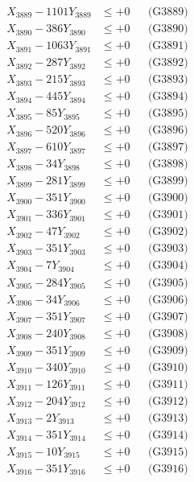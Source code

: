 \documentclass[a4paper,10pt]{article}
\begin{document}
{\begin{align}
X_{3889} - 1101Y_{3889} &\leq +0 && \text{(G3889)} \\
X_{3890} - 386Y_{3890} &\leq +0 && \text{(G3890)} \\
\allowbreak
X_{3891} - 1063Y_{3891} &\leq +0 && \text{(G3891)} \\
X_{3892} - 287Y_{3892} &\leq +0 && \text{(G3892)} \\
X_{3893} - 215Y_{3893} &\leq +0 && \text{(G3893)} \\
X_{3894} - 445Y_{3894} &\leq +0 && \text{(G3894)} \\
X_{3895} - 85Y_{3895} &\leq +0 && \text{(G3895)} \\
X_{3896} - 520Y_{3896} &\leq +0 && \text{(G3896)} \\
X_{3897} - 610Y_{3897} &\leq +0 && \text{(G3897)} \\
X_{3898} - 34Y_{3898} &\leq +0 && \text{(G3898)} \\
X_{3899} - 281Y_{3899} &\leq +0 && \text{(G3899)} \\
X_{3900} - 351Y_{3900} &\leq +0 && \text{(G3900)} \\
\allowbreak
X_{3901} - 336Y_{3901} &\leq +0 && \text{(G3901)} \\
X_{3902} - 47Y_{3902} &\leq +0 && \text{(G3902)} \\
X_{3903} - 351Y_{3903} &\leq +0 && \text{(G3903)} \\
X_{3904} - 7Y_{3904} &\leq +0 && \text{(G3904)} \\
X_{3905} - 284Y_{3905} &\leq +0 && \text{(G3905)} \\
X_{3906} - 34Y_{3906} &\leq +0 && \text{(G3906)} \\
X_{3907} - 351Y_{3907} &\leq +0 && \text{(G3907)} \\
X_{3908} - 240Y_{3908} &\leq +0 && \text{(G3908)} \\
X_{3909} - 351Y_{3909} &\leq +0 && \text{(G3909)} \\
X_{3910} - 340Y_{3910} &\leq +0 && \text{(G3910)} \\
\allowbreak
X_{3911} - 126Y_{3911} &\leq +0 && \text{(G3911)} \\
X_{3912} - 204Y_{3912} &\leq +0 && \text{(G3912)} \\
X_{3913} - 2Y_{3913} &\leq +0 && \text{(G3913)} \\
X_{3914} - 351Y_{3914} &\leq +0 && \text{(G3914)} \\
X_{3915} - 10Y_{3915} &\leq +0 && \text{(G3915)} \\
X_{3916} - 351Y_{3916} &\leq +0 && \text{(G3916)} \\

\end{align}}
\end{document}
